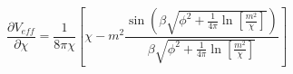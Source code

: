 \begin{equation}
\frac{\partial V_{eff}} {\partial \chi}= \frac{1} {8 \pi \chi} \left[\chi -
{m^2}
\frac {\sin \left( \beta \sqrt{\phi^2+ \frac{1}{4 \pi}
\ln[\frac{m^2}{\chi}]} \right)}{\beta \sqrt{
\phi^2 +\frac{1}{4
\pi}
\ln[\frac{m^2}{\chi}]}}   \right]
\end{equation}

